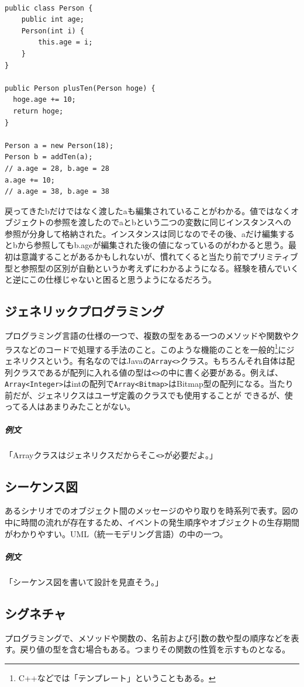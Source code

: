 \documentclass[a4paper]{ltjsreport}
\newcommand{\terlogy}[2][|]{\colorbox{terlogy}{\texttt{\lstinline#1#2#1}}}
\begin{document}
\lstset{language=Java}
\begin{lstlisting}

public class Person {
    public int age;
    Person(int i) {
        this.age = i;
    }
}

public Person plusTen(Person hoge) {
  hoge.age += 10;
  return hoge;
}

Person a = new Person(18);
Person b = addTen(a);
// a.age = 28, b.age = 28
a.age += 10;
// a.age = 38, b.age = 38
\end{lstlisting}
戻ってきたbだけではなく渡したaも編集されていることがわかる。値ではなくオブジェクトの参照を渡したのでaとbという二つの変数に同じインスタンスへの参照が分身して格納された。インスタンスは同じなのでその後、aだけ編集するとbから参照してもb.ageが編集された後の値になっているのがわかると思う。最初は意識することがあるかもしれないが、慣れてくると当たり前でプリミティブ型と参照型の区別が自動というか考えずにわかるようになる。経験を積んでいくと逆にこの仕様じゃないと困ると思うようになるだろう。

\subsection{ジェネリックプログラミング}
プログラミング言語の仕様の一つで、複数の型をある一つのメソッドや関数やクラスなどのコードで処理する手法のこと。このような機能のことを一般的\footnote{C++などでは「テンプレート」ということもある。}にジェネリクスという。有名なのではJavaの\terlogy{Array<>}クラス。もちろんそれ自体は配列クラスであるが配列に入れる値の型は\terlogy{<>}の中に書く必要がある。例えば、\terlogy{Array<Integer>}はintの配列で\terlogy{Array<Bitmap>}はBitmap型の配列になる。当たり前だが、ジェネリクスはユーザ定義のクラスでも使用することが
できるが、使ってる人はあまりみたことがない。

\subparagraph{例文} 「Arrayクラスはジェネリクスだからそこ\terlogy{<>}が必要だよ。」

\subsection{シーケンス図}
あるシナリオでのオブジェクト間のメッセージのやり取りを時系列で表す。図の中に時間の流れが存在するため、イベントの発生順序やオブジェクトの生存期間がわかりやすい。UML（統一モデリング言語）の中の一つ。

\subparagraph{例文} 「シーケンス図を書いて設計を見直そう。」

\subsection{シグネチャ}
プログラミングで、メソッドや関数の、名前および引数の数や型の順序などを表す。戻り値の型を含む場合もある。つまりその関数の性質を示すものとなる。
\end{document}
